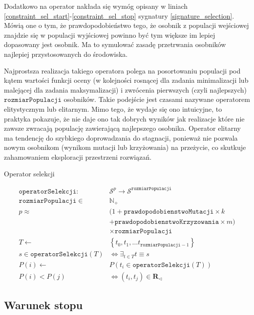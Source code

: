 \documentclass[twoside]{iisthesis}
\newcommand{\numberSet}{\mathbb}
\newcommand{\important}{\mathcal}
\newcommand{\R}{\mathbf{R}}
\newcommand{\minoritySpecimenRel}{{\R}_{\lhd}}
\newcommand{\param}{\mathtt}
\begin{document}
Dodatkowo na operator nakłada się wymóg opisany w liniach \ref{constraint_sel_start}-\ref{constraint_sel_stop} sygnatury \ref{signature_selection}. Mówią one o tym, że prawdopodobieństwo tego, że osobnik z populacji wejściowej znajdzie się w populacji wyjściowej powinno być tym większe im lepiej dopasowany jest osobnik. Ma to symulować zasadę przetrwania osobników najlepiej przystosowanych do środowiska.

Najprostsza realizacja takiego operatora polega na posortowaniu populacji pod kątem wartości funkcji oceny (w kolejności rosnącej dla zadania minimalizacji lub malejącej dla zadania maksymalizacji) i zwrócenia pierwszych (czyli najlepszych) $\param{rozmiarPopulacji}$ osobników. Takie podejście jest czasami nazywane operatorem elitystycznym lub elitarnym. Mimo tego, że wydaje się ono intuicyjne, to praktyka pokazuje, że nie daje ono tak dobrych wyników jak realizacje które nie zawsze zwracają populację zawierającą najlepszego osobnika. Operator elitarny ma tendencję do szybkiego doprowadzania do stagnacji, ponieważ nie pozwala nowym osobnikom (wynikom mutacji lub krzyżowania) na przeżycie, co skutkuje zahamowaniem eksploracji przestrzeni rozwiązań.

\begin{signature}
	\caption{Operator selekcji \label{signature_selection}}
	\begin{align}
	\param{operatorSelekcji}: &\important{S}^p \rightarrow \important{S}^{\param{rozmiarPopulacji}} \\
	\param{rozmiarPopulacji} \in &\numberSet{N}_{+} \\
	\label{p_start} 
	p \approx &(1 + \param{prawdopodobienstwoMutacji} \times k \\
	          &+ \param{prawdopodobienstwoKrzyzowania} \times m) \\
	\label{p_stop} 
	&\times \param{rozmiarPopulacji} \\
	\label{constraint_sel_start}          
	T \gets &\left\{ t_0, t_1, \ldots t_{\param{rozmiarPopulacji}-1} \right\} \\
	s \in \param{operatorSelekcji}(T) &\Leftrightarrow \exists_{t \in T}  t \equiv s \\
	P(i) \gets &P(t_i \in \param{operatorSelekcji}(T)) \\
	\label{constraint_sel_stop} 
	P(i) < P(j) &\Leftrightarrow (t_i, t_j) \in \minoritySpecimenRel
	\end{align}
\end{signature}

\subsection{Warunek stopu} \label{subsection_stop}
\end{document}
